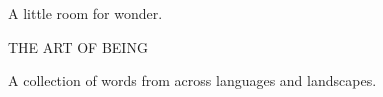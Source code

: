 \begin{ArtPage}
\centering
\vspace*{\fill}
{\Fontgaramonditalic\fontsize{23}{30}\selectfont\color{Poetic}%
  A little room for wonder.\par}
\vspace{1.5cm}
\ArtRule[.22\linewidth]
\vspace{1.25cm}
{\Fontgaramondbold\fontsize{6.5}{9}\selectfont\color{Muted}%
  THE ART OF BEING\par}
\vspace{0.55cm}
{\Fontgaramond\fontsize{11.5}{15}\selectfont\color{Muted}%
  A collection of words from across languages and landscapes.\par}
\vspace*{\fill}
\end{ArtPage}
